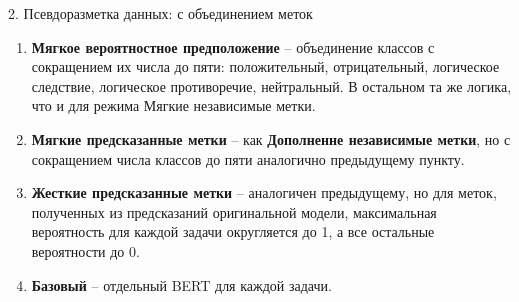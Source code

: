 \begin{frame}{2. Псевдоразметка данных: с объединением меток}
    \begin{enumerate}
\item \textbf{Мягкое вероятностное предположение} -- объединение классов с сокращением их числа до пяти: положительный, отрицательный, логическое следствие, логическое противоречие, нейтральный. В остальном та же логика, что и для режима Мягкие независимые метки.
\item \textbf{Мягкие предсказанные метки} -- как \textbf{Дополненне независимые метки}, но с сокращением числа классов до пяти аналогично предыдущему пункту. 
\item \textbf{Жесткие предсказанные метки} -- аналогичен предыдущему, но для меток, полученных из предсказаний оригинальной модели, максимальная вероятность для каждой задачи округляется до 1, а все остальные вероятности до 0.
\item \textbf{Базовый} -- отдельный BERT для каждой задачи.
    \end{enumerate}
\end{frame}


